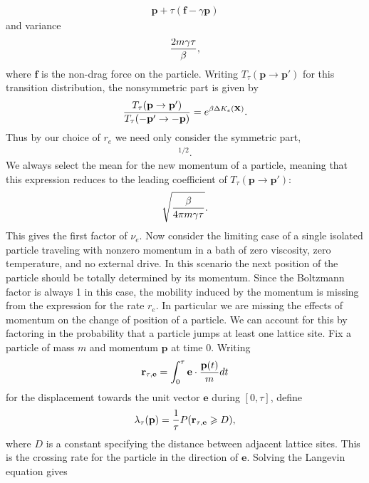 \documentclass[12pt,letterpaper]{article}
\newcommand{\mb}{\mathbf}
\begin{document}
\begin{itemize}
\begin{align*}
\mb{p} + \tau(\mb{f} - \gamma\mb{p})
\end{align*}
and variance
\begin{align*}
{2m\gamma\tau \over \beta},
\end{align*}
where $\mb{f}$ is the non-drag force on the particle. Writing $T_{\tau}(\mb{p} \rightarrow \mb{p}')$ for this transition distribution, the nonsymmetric part is given by
\begin{align*}
{T_{\tau}(\mb{p} \rightarrow \mb{p}') \over T_{\tau}(-\mb{p}' \rightarrow -\mb{p})} = e^{\beta\Delta K_{e}(\mb{X})}.
\end{align*}
Thus by our choice of $r_{e}$ we need only consider the symmetric part,
\begin{align*}
[T_{\tau}(\mb{p} \rightarrow \mb{p}') T_{\tau}(-\mb{p}' \rightarrow -\mb{p})]^{1/2}.
\end{align*}
We always select the mean for the new momentum of a particle, meaning that this expression reduces to the leading coefficient of $T_{\tau}(\mb{p} \rightarrow \mb{p}')$:
\begin{align*}
\sqrt{\beta \over 4\pi m\gamma\tau}.
\end{align*}
This gives the first factor of $\nu_{e}$. Now consider the limiting case of a single isolated particle traveling with nonzero momentum in a bath of zero viscosity, zero temperature, and no external drive. In this scenario the next position of the particle should be totally determined by its momentum. Since the Boltzmann factor is always 1 in this case, the mobility induced by the momentum is missing from the expression for the rate $r_{e}$. In particular we are missing the effects of momentum on the change of position of a particle. We can account for this by factoring in the probability that a particle jumps at least one lattice site. Fix a particle of mass $m$ and momentum $\mb{p}$ at time $0$. Writing
\begin{align*}
\mb{r}_{\tau, \mb{e}} = \int_{0}^{\tau}\mb{e} \cdot {\mb{p}(t) \over m}dt
\end{align*}
for the displacement towards the unit vector $\mb{e}$ during $[0, \tau]$, define
\begin{align*}
\lambda_{\tau}(\mb{p}) = {1 \over \tau}P(\mb{r}_{\tau, \mb{e}} \geqslant D),
\end{align*}
where $D$ is a constant specifying the distance between adjacent lattice sites. This is the crossing rate for the particle in the direction of $\mb{e}$. Solving the Langevin equation gives

\end{itemize}
\end{document}
